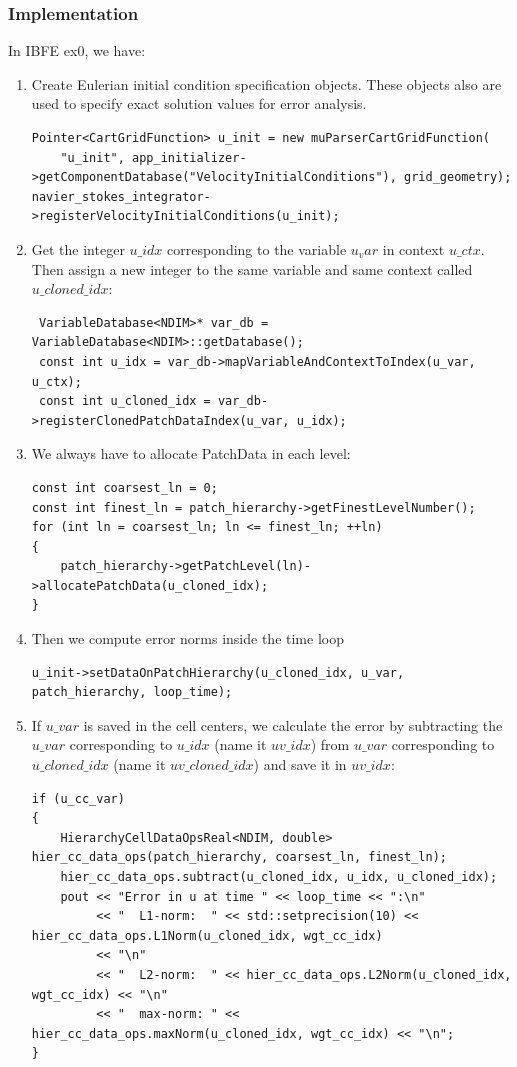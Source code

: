 \documentclass[12pt,a4paper,twoside]{article}
\begin{document}
\subsubsection{Implementation}
In IBFE ex0, we have:

\begin{enumerate}
    \item Create Eulerian initial condition specification objects.  These objects also are used to specify exact solution values for error analysis.
\begin{lstlisting}
Pointer<CartGridFunction> u_init = new muParserCartGridFunction(
    "u_init", app_initializer->getComponentDatabase("VelocityInitialConditions"), grid_geometry);
navier_stokes_integrator->registerVelocityInitialConditions(u_init);
\end{lstlisting}

\item Get the integer $u\_idx$ corresponding to the variable $u_var$ in context $u\_ctx$. Then assign a new integer to the same variable and same context called $u\_cloned\_idx$:
\begin{lstlisting}
 VariableDatabase<NDIM>* var_db = VariableDatabase<NDIM>::getDatabase();
 const int u_idx = var_db->mapVariableAndContextToIndex(u_var, u_ctx);
 const int u_cloned_idx = var_db->registerClonedPatchDataIndex(u_var, u_idx);
\end{lstlisting}

\item We always have to allocate PatchData in each level:
\begin{lstlisting}
const int coarsest_ln = 0;
const int finest_ln = patch_hierarchy->getFinestLevelNumber();
for (int ln = coarsest_ln; ln <= finest_ln; ++ln)
{
    patch_hierarchy->getPatchLevel(ln)->allocatePatchData(u_cloned_idx);
}
\end{lstlisting}

\item Then we compute error norms inside the time loop
\begin{lstlisting}
u_init->setDataOnPatchHierarchy(u_cloned_idx, u_var, patch_hierarchy, loop_time);
\end{lstlisting}

\item If  $u\_var$ is saved in the cell centers, we calculate the error by subtracting the $u\_var$ corresponding to $u\_idx$ (name it $uv\_idx$) from $u\_var$ corresponding to $u\_cloned\_idx$ (name it $uv\_cloned\_idx$) and save it in $uv\_idx$:
\begin{lstlisting}
if (u_cc_var)
{
    HierarchyCellDataOpsReal<NDIM, double> hier_cc_data_ops(patch_hierarchy, coarsest_ln, finest_ln);
    hier_cc_data_ops.subtract(u_cloned_idx, u_idx, u_cloned_idx);
    pout << "Error in u at time " << loop_time << ":\n"
         << "  L1-norm:  " << std::setprecision(10) << hier_cc_data_ops.L1Norm(u_cloned_idx, wgt_cc_idx)
         << "\n"
         << "  L2-norm:  " << hier_cc_data_ops.L2Norm(u_cloned_idx, wgt_cc_idx) << "\n"
         << "  max-norm: " << hier_cc_data_ops.maxNorm(u_cloned_idx, wgt_cc_idx) << "\n";
}
\end{lstlisting}


\end{enumerate}
\end{document}
